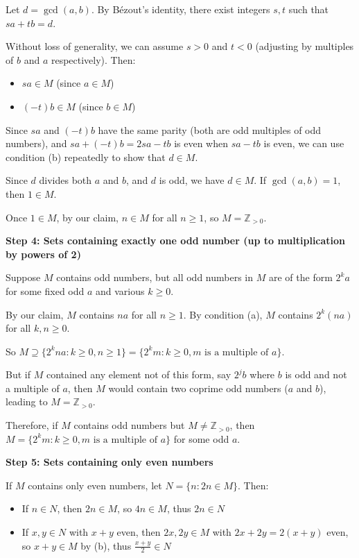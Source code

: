 \documentclass[12pt,a4paper]{article}
\theoremstyle{definition}
\begin{document}
        Let $d = \gcd(a,b)$. By Bézout's identity, there exist integers $s, t$ such that $sa + tb = d$.

        Without loss of generality, we can assume $s > 0$ and $t < 0$ (adjusting by multiples of $b$ and $a$ respectively). Then:
        \begin{itemize}
            \item $sa \in M$ (since $a \in M$)
            \item $(-t)b \in M$ (since $b \in M$)
        \end{itemize}

        Since $sa$ and $(-t)b$ have the same parity (both are odd multiples of odd numbers), and $sa + (-t)b = 2sa - tb$ is even when $sa - tb$ is even, we can use condition (b) repeatedly to show that $d \in M$.

        Since $d$ divides both $a$ and $b$, and $d$ is odd, we have $d \in M$. If $\gcd(a,b) = 1$, then $1 \in M$.

        Once $1 \in M$, by our claim, $n \in M$ for all $n \geq 1$, so $M = \mathbb{Z}_{>0}$.

        \textbf{Step 4: Sets containing exactly one odd number (up to multiplication by powers of 2)}

        Suppose $M$ contains odd numbers, but all odd numbers in $M$ are of the form $2^k a$ for some fixed odd $a$ and various $k \geq 0$.

        By our claim, $M$ contains $na$ for all $n \geq 1$. By condition (a), $M$ contains $2^k(na)$ for all $k, n \geq 0$.

        So $M \supseteq \{2^k n a : k \geq 0, n \geq 1\} = \{2^k m : k \geq 0, m \text{ is a multiple of } a\}$.

        But if $M$ contained any element not of this form, say $2^j b$ where $b$ is odd and not a multiple of $a$, then $M$ would contain two coprime odd numbers ($a$ and $b$), leading to $M = \mathbb{Z}_{>0}$.

        Therefore, if $M$ contains odd numbers but $M \neq \mathbb{Z}_{>0}$, then $M = \{2^k m : k \geq 0, m \text{ is a multiple of } a\}$ for some odd $a$.

        \textbf{Step 5: Sets containing only even numbers}

        If $M$ contains only even numbers, let $N = \{n : 2n \in M\}$. Then:
        \begin{itemize}
            \item If $n \in N$, then $2n \in M$, so $4n \in M$, thus $2n \in N$
            \item If $x, y \in N$ with $x + y$ even, then $2x, 2y \in M$ with $2x + 2y = 2(x + y)$ even, so $x + y \in M$ by (b), thus $\frac{x + y}{2} \in N$
        \end{itemize}
\end{document}
